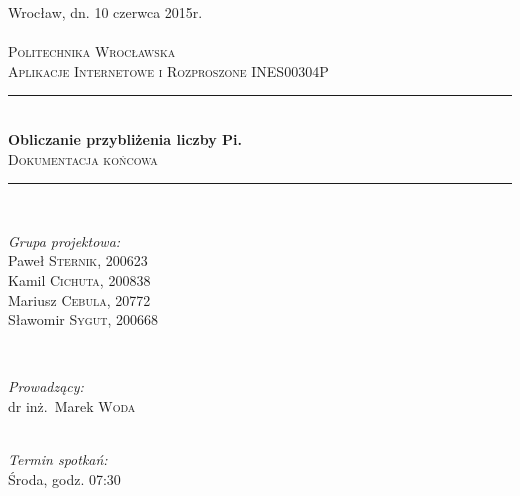 \documentclass[a4paper,12pt]{article}		%
\newcommand{\Title}{Obliczanie przybliżenia liczby Pi.}
\newcommand{\UnderTitle}{Dokumentacja końcowa}
\newcommand{\University}{Politechnika Wrocławska}
\newcommand{\Class}{Aplikacje Internetowe i Rozproszone INES00304P}
\newcommand{\ClassDay}{Środa}
\newcommand{\ClassTime}{07:30}
\newcommand{\HRule}{\rule{\linewidth}{0.5mm}}		%
\begin{document}
\begin{titlepage}
\hfill Wrocław, dn. 10 czerwca 2015r.\\
\center
\textsc{}\\[1.5cm]
\textsc{\LARGE \University}\\[1.5cm]
\textsc{\Large \Class}\\[1.5cm]


\HRule \\[0.7cm]
{ \huge \bfseries \Title}\\[0.4cm]
\textsc{\large \UnderTitle}\\[0.5cm]
\HRule \\[1.0cm]


\begin{minipage}{0.5\textwidth}
\begin{flushleft} \large
\emph{Grupa projektowa:}
\\ Paweł \textsc{Sternik}, 200623
\\ Kamil \textsc{Cichuta}, 200838
\\ Mariusz \textsc{Cebula}, 20772
\\ Sławomir \textsc{Sygut}, 200668
\end{flushleft}
\end{minipage}
~
\begin{minipage}{0.4\textwidth}
\begin{flushright} \large
\emph{Prowadzący:}
\\ dr inż.~Marek \textsc{Woda}
\end{flushright}
\end{minipage}\\[3cm]


\emph{Termin spotkań:}\\[0.35cm]
{\large \ClassDay, godz. \ClassTime}\\[0.5cm]
\vfill
\end{titlepage}
\end{document}
